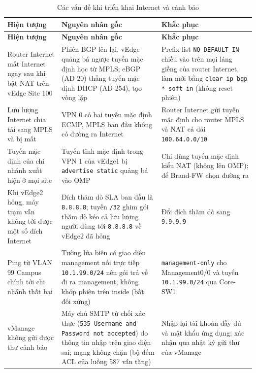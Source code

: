 \begingroup
\small
\begin{longtable}{|P{3.0cm}|P{5.2cm}|P{5.3cm}|}
    \caption{Các vấn đề khi triển khai Internet và cảnh báo}\label{tab:loi_internet} \\
    \hline
    \textbf{Hiện tượng} & \textbf{Nguyên nhân gốc} & \textbf{Khắc phục} \\
    \hline
    \endfirsthead
    \hline
    \textbf{Hiện tượng} & \textbf{Nguyên nhân gốc} & \textbf{Khắc phục} \\
    \hline
    \endhead
    \hline
    \endfoot
    Router Internet mất Internet ngay sau khi bật NAT trên vEdge Site 100 & Phiên BGP lên lại, vEdge quảng bá ngược tuyến mặc định học từ MPLS; eBGP (AD 20) thắng tuyến mặc định DHCP (AD 254), tạo vòng lặp & Prefix-list \texttt{NO\_DEFAULT\_IN} chiều vào trên mọi láng giềng của router Internet, làm mới bằng \texttt{clear ip bgp * soft in} (không reset phiên) \\
    \hline
    Lưu lượng Internet chia tải sang MPLS và bị mất & VPN 0 có hai tuyến mặc định ECMP, MPLS ban đầu không có đường ra Internet & Router Internet gửi tuyến mặc định cho router MPLS và NAT cả dải \texttt{100.64.0.0/10} \\
    \hline
    Tuyến mặc định của chi nhánh xuất hiện ở mọi site & Tuyến tĩnh mặc định trong VPN 1 của vEdge1 bị \texttt{advertise static} quảng bá vào OMP & Chỉ dùng tuyến mặc định kiểu NAT (không lên OMP); để Brand-FW chọn đường ra \\
    \hline
    Khi vEdge2 hỏng, máy trạm vẫn không tới được một số đích Internet & Đích thăm dò SLA ban đầu là \texttt{8.8.8.8}; tuyến \texttt{/32} ghim gói thăm dò kéo cả lưu lượng người dùng tới \texttt{8.8.8.8} về vEdge2 đã hỏng & Đổi đích thăm dò sang \texttt{9.9.9.9} \\
    \hline
    Ping từ VLAN 99 Campus chính tới chi nhánh thất bại & Tường lửa biên có giao diện management nối trực tiếp \texttt{10.1.99.0/24} nên gói trả về đi ra management, không khớp phiên trên inside (bất đối xứng) & \texttt{management-only} cho Management0/0 và tuyến \texttt{10.1.99.0/24} qua Core-SW1 \\
    \hline
    vManage không gửi được thư cảnh báo & Máy chủ SMTP từ chối xác thực (\texttt{535 Username and Password not accepted}) do thông tin nhập trên giao diện sai; mạng không chặn (bộ đếm ACL của luồng 587 vẫn tăng) & Nhập lại tài khoản đầy đủ và mật khẩu ứng dụng; xác nhận qua nhật ký gửi thư của vManage \\
\end{longtable}
\endgroup

